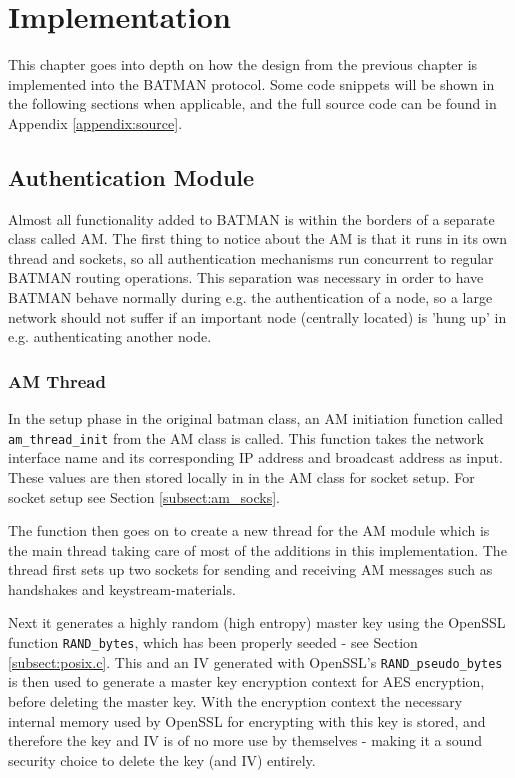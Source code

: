 \chapter{Implementation}
\label{ch:implementation}
\acresetall

This chapter goes into depth on how the design from the previous chapter is
implemented into the BATMAN protocol. Some code snippets will be shown in the
following sections when applicable, and the full source code can be found in
Appendix \ref{appendix:source}.


\section{Authentication Module}
Almost all functionality added to BATMAN is within the borders of a separate
class called \ac{AM}. The first thing to notice about the \ac{AM} is that it
runs in its own thread and sockets, so all authentication mechanisms run
concurrent to regular BATMAN routing operations. This separation was necessary
in order to have BATMAN behave normally during e.g. the authentication of a
node, so a large network should not suffer if an important node (centrally
located) is 'hung up' in e.g. authenticating another node.

\subsection{AM Thread}
In the setup phase in the original batman class, an \ac{AM} initiation function
called \texttt{am\_thread\_init} from the \ac{AM} class is called. This function
takes the network interface name and its corresponding IP address and broadcast
address as input. These values are then stored locally in in the AM class for
socket setup. For socket setup see Section \ref{subsect:am_socks}.

The function then goes on to create a new thread for the AM module which is the
main thread taking care of most of the additions in this implementation. The
thread first sets up two sockets for sending and receiving AM messages such as
handshakes and keystream-materials.

Next it generates a highly random (high entropy) master key using the OpenSSL
function \texttt{RAND\_bytes}, which has been properly seeded - see Section
\ref{subsect:posix.c}. This and an IV generated with OpenSSL's
\texttt{RAND\_pseudo\_bytes} is then used to generate a master key encryption
context for AES encryption, before deleting the master key. With the encryption
context the necessary internal memory used by OpenSSL for encrypting with this
key is stored, and therefore the key and IV is of no more use by themselves -
making it a sound security choice to delete the key (and IV) entirely.

